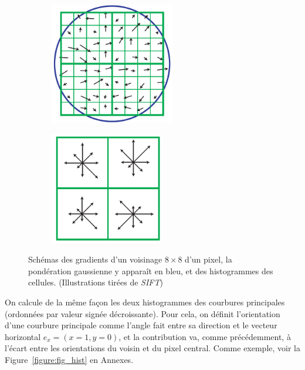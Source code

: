 \documentclass[
	a4paper, %
	10pt, %
	unnumberedsections, %
	twoside, %
]{LTJournalArticle}
\begin{document}
\begin{figure}[H]
	\centering
	\begin{subfigure}[H]{\columnwidth}
		\centering
		\includegraphics[width=0.6\textwidth]{images/lowe_grads.png}
	\end{subfigure}
	\begin{subfigure}[H]{\columnwidth}
		\centering
		\includegraphics[width=0.55\textwidth]{images/lowe_desc.png}
	\end{subfigure}
	\caption{Schémas des gradients d'un voisinage $8 \times 8$ d'un pixel, la pondération
		gaussienne y apparaît en bleu, et des histogrammes des cellules. (Illustrations tirées
		de \textit{SIFT}) }
	\label{figure:lowe_desc_constr}
\end{figure}

On calcule de la même façon les deux histogrammes des courbures principales
(ordonnées par valeur signée décroissante). Pour cela,
on définit l'orientation d'une courbure principale comme l'angle fait entre sa
direction et le vecteur horizontal $e_x=(x=1, y=0)$, et la contribution va,
comme précédemment, à l'écart entre les orientations du voisin et du pixel central.
Comme exemple, voir la Figure~\ref{figure:fig_hist} en Annexes.
\end{document}
